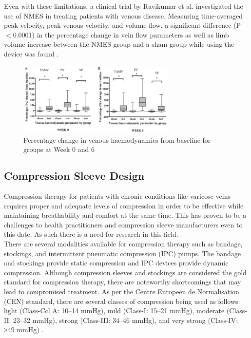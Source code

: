 \documentclass[11.5pt]{article}
\begin{document}
Even with these limitations, a clinical trial by Ravikumar et al. investigated the use of NMES in treating patients with venous disease. Measuring time-averaged peak velocity, peak venous velocity, and volume flow, a significant difference (P$<$0.0001) in the percentage change in vein flow parameters as well as limb volume increase between the NMES group and a sham group while using the device was found \cite{Ravikumar}.

\begin{figure}[H]
    \centering
    \includegraphics[width=0.7\textwidth]{litreview/wk0wk6.png}
    \caption{Percentage change in venous haemodynamics from baseline for groups at Week 0 and 6 \cite{Narayana}}
    \label{fig:strvscsa}
\end{figure}

\subsection{Compression Sleeve Design}
Compression therapy for patients with chronic conditions like varicose veins requires proper and adequate levels of compression in order to be effective while maintaining breathability and comfort at the same time. This has proven to be a challenges to health practitioners and compression sleeve manufacturers even to this date. As such there is a need for research in this field.\\

There are several modalities available for compression therapy such as bandage, stockings, and intermittent pneumatic compression (IPC) pumps. The bandage and stockings provide static compression and IPC devices provide dynamic compression. Although compression sleeves and stockings are considered the gold standard for compression therapy, there are noteworthy shortcomings that may lead to compromised treatment. As per the Centre Europeen de Normalisation (CEN) standard, there are several classes of compression being used as follows: light (Class-Ccl A: 10–14 mmHg), mild (Class-I: 15–21 mmHg), moderate (Class-II: 23–32 mmHg), strong (Class-III: 34–46 mmHg), and very strong (Class-IV: ≥49 mmHg) \cite{Narayana}.\\
\end{document}
